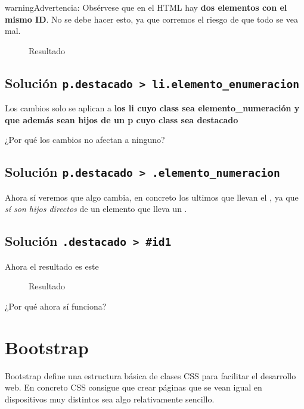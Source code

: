 \documentclass[letterpaper,10pt,spanish]{sphinxmanual}
\begin{document}
\begin{notice}{warning}{Advertencia:}
Obsérvese que en el HTML hay \textbf{dos elementos con el mismo ID}. No se debe hacer esto, ya que corremos el riesgo de que todo se vea mal.
\end{notice}
\begin{figure}[htbp]
\centering
\capstart

\noindent{}
\caption{Resultado}\label{tema3:id11}\end{figure}


\subsection{Solución \texttt{p.destacado \textgreater{} li.elemento\_enumeracion}}
\label{tema3:solucion-p-destacado-li-elemento-enumeracion}
Los cambios solo se aplican a \textbf{los li cuyo class sea elemento\_numeración y que además sean hijos de un p cuyo class sea destacado}

¿Por qué los cambios no afectan a ninguno?


\subsection{Solución \texttt{p.destacado \textgreater{} .elemento\_numeracion}}
\label{tema3:solucion-p-destacado-elemento-numeracion}
Ahora sí veremos que algo cambia, en concreto los ultimos  que llevan el , ya que \emph{sí son hijos directos} de un elemento que lleva un .


\subsection{Solución \texttt{.destacado \textgreater{} \#id1}}
\label{tema3:solucion-destacado-id1}
Ahora el resultado es este
\begin{figure}[htbp]
\centering
\capstart

\noindent{}
\caption{Resultado}\label{tema3:id12}\end{figure}

¿Por qué ahora sí funciona?


\section{Bootstrap}
\label{tema3:bootstrap}
Bootstrap define una estructura básica de clases CSS para facilitar el desarrollo web. En concreto CSS consigue que crear páginas que se vean igual en dispositivos muy distintos sea algo relativamente sencillo.
\end{document}
